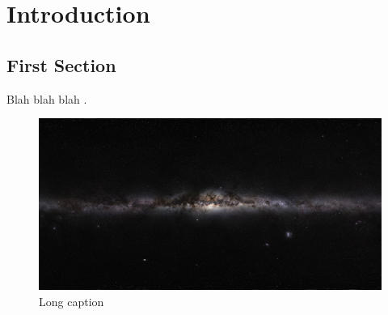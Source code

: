 \chapter{Introduction} \label{chap:intro}

\section{First Section}

Blah blah blah \citep{galilei1610}.

\begin{figure}[p]
  \centering
  \includegraphics[width=\textwidth]{chapter_1/figures/milkyway.jpg}
  \caption[Short Caption for list of Figures]{Long caption}
  \label{fig:chap1_milkyway}
\end{figure}
\afterpage{\clearpage}
